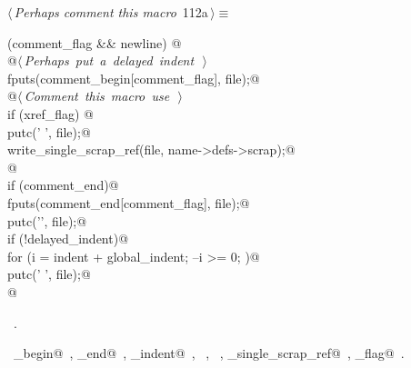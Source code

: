 \documentclass[a4paper]{report}
\begin{document}
\begin{flushleft} \small
\begin{minipage}{\linewidth}\label{scrap236}\raggedright\small
{} $\langle\,${\it Perhaps comment this macro}\nobreak\ {\footnotesize {112a}}$\,\rangle\equiv$
\vspace{-1ex}
\begin{list}{}{} \item
\mbox{}\verb@if (comment_flag && newline) {@\\
\mbox{}\verb@   @\hbox{$\langle\,${\it Perhaps put a delayed indent}\nobreak\ {\footnotesize {}}$\,\rangle$}\verb@@\\
\mbox{}\verb@   fputs(comment_begin[comment_flag], file);@\\
\mbox{}\verb@   @\hbox{$\langle\,${\it Comment this macro use}\nobreak\ {\footnotesize {}}$\,\rangle$}\verb@@\\
\mbox{}\verb@   if (xref_flag) {@\\
\mbox{}\verb@      putc(' ', file);@\\
\mbox{}\verb@      write_single_scrap_ref(file, name->defs->scrap);@\\
\mbox{}\verb@   }@\\
\mbox{}\verb@   if (comment_end)@\\
\mbox{}\verb@      fputs(comment_end[comment_flag], file);@\\
\mbox{}\verb@   putc('\n', file);@\\
\mbox{}\verb@   if (!delayed_indent)@\\
\mbox{}\verb@      for (i = indent + global_indent; --i >= 0; )@\\
\mbox{}\verb@         putc(' ', file);@\\
\mbox{}\verb@}@\\
\mbox{}\verb@@{\NWsep}
\end{list}
\vspace{-1.5ex}
\footnotesize
\begin{list}{}{\setlength{\itemsep}{-\parsep}\setlength{\itemindent}{-\leftmargin}}
\item \NWtxtMacroRefIn\ .
\item \NWtxtIdentsUsed\nobreak\  \verb@comment_begin@\nobreak\ , \verb@comment_end@\nobreak\ , \verb@delayed_indent@\nobreak\ , \verb@fputs@\nobreak\ , \verb@putc@\nobreak\ , \verb@write_single_scrap_ref@\nobreak\ , \verb@xref_flag@\nobreak\ .
\item{}
\end{list}
\end{minipage}\vspace{4ex}
\end{flushleft}
\end{document}
